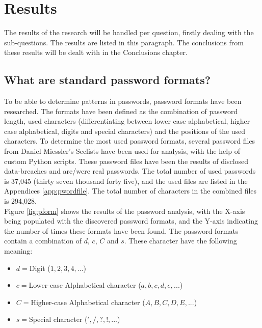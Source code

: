 \documentclass[a4paper,12pt]{article}
\begin{document}
\section{Results}

The results of the research will be handled per question, firstly dealing with the sub-questions. The results are listed in this paragraph. The conclusions from these results will be dealt with in the Conclusions chapter.

\subsection{What are standard password formats?}

To be able to determine patterns in passwords, password formats have been researched. The formats have been defined as the combination of password length, used characters (differentiating between lower case alphabetical, higher case alphabetical, digits and special characters) and the positions of the used characters. To determine the most used password formats, several password files from Daniel Miessler's Seclists \cite{bib:seclists} have been used for analysis, with the help of custom Python scripts. These password files have been the results of disclosed data-breaches and are/were real passwords. The total number of used passwords is 37,045 (thirty seven thousand forty five), and the used files are listed in the Appendices \ref{app:pwordfile}. The total number of characters in the combined files is 294,028.\\

Figure \ref{fig:pform} shows the results of the password analysis, with the X-axis being populated with the discovered password formats, and the Y-axis indicating the number of times these formats have been found. The password formats contain a combination of $d$, $c$, $C$ and $s$. These character have the following meaning:
\begin{itemize}
\item $d=$Digit ($1,2,3,4,...$)
\item $c=$Lower-case Alphabetical character ($a,b,c,d,e,...$)
\item $C=$Higher-case Alphabetical character ($A,B,C,D,E,...$)
\item $s=$Special character ($',/,?,!,...$)
\end{itemize}
\end{document}
